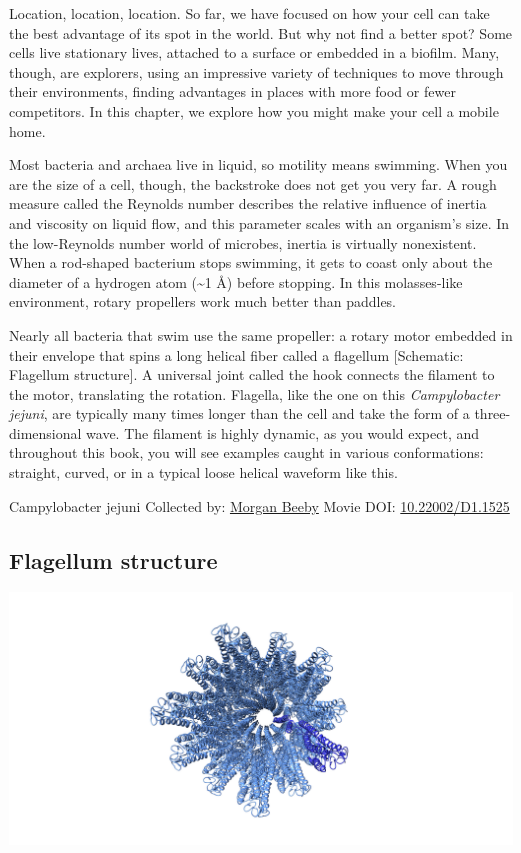\documentclass[]{tufte-book}
\begin{document}
Location, location, location. So far, we have focused on how your cell can take the best advantage of its spot in the world. But why not find a better spot? Some cells live stationary lives, attached to a surface or embedded in a biofilm. Many, though, are explorers, using an impressive variety of techniques to move through their environments, finding advantages in places with more food or fewer competitors. In this chapter, we explore how you might make your cell a mobile home.

Most bacteria and archaea live in liquid, so motility means swimming. When you are the size of a cell, though, the backstroke does not get you very far. A rough measure called the Reynolds number describes the relative influence of inertia and viscosity on liquid flow, and this parameter scales with an organism's size. In the low-Reynolds number world of microbes, inertia is virtually nonexistent. When a rod-shaped bacterium stops swimming, it gets to coast only about the diameter of a hydrogen atom (\textasciitilde{}1 Å) before stopping. In this molasses-like environment, rotary propellers work much better than paddles.

Nearly all bacteria that swim use the same propeller: a rotary motor embedded in their envelope that spins a long helical fiber called a flagellum {[}Schematic: Flagellum structure{]}. A universal joint called the hook connects the filament to the motor, translating the rotation. Flagella, like the one on this \emph{Campylobacter jejuni}, are typically many times longer than the cell and take the form of a three-dimensional wave. The filament is highly dynamic, as you would expect, and throughout this book, you will see examples caught in various conformations: straight, curved, or in a typical loose helical waveform like this.



\hypertarget{htmlwidget-273ee8d82eb842dfbe37}{}

\label{fig:6-1}Campylobacter jejuni Collected by: \protect\hyperlink{morgan_beeby}{Morgan Beeby} Movie DOI: \href{https://doi.org/10.22002/D1.1525}{10.22002/D1.1525}

\hypertarget{Flagellum_structure}{%
\subsection{Flagellum structure}\label{Flagellum_structure}}

\includegraphics{img/schematics/6_1_1}
\end{document}
